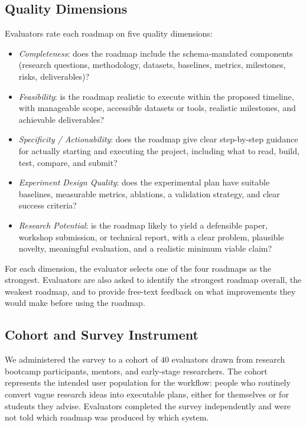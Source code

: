 \documentclass[11pt]{article}
\begin{document}
\subsection{Quality Dimensions}
\label{sec:dimensions}

Evaluators rate each roadmap on five quality dimensions:

\begin{itemize}
    \item \emph{Completeness}: does the roadmap include the schema-mandated components (research questions, methodology, datasets, baselines, metrics, milestones, risks, deliverables)?
    \item \emph{Feasibility}: is the roadmap realistic to execute within the proposed timeline, with manageable scope, accessible datasets or tools, realistic milestones, and achievable deliverables?
    \item \emph{Specificity / Actionability}: does the roadmap give clear step-by-step guidance for actually starting and executing the project, including what to read, build, test, compare, and submit?
    \item \emph{Experiment Design Quality}: does the experimental plan have suitable baselines, measurable metrics, ablations, a validation strategy, and clear success criteria?
    \item \emph{Research Potential}: is the roadmap likely to yield a defensible paper, workshop submission, or technical report, with a clear problem, plausible novelty, meaningful evaluation, and a realistic minimum viable claim?
\end{itemize}

For each dimension, the evaluator selects one of the four roadmaps as the strongest. Evaluators are also asked to identify the strongest roadmap overall, the weakest roadmap, and to provide free-text feedback on what improvements they would make before using the roadmap.

\subsection{Cohort and Survey Instrument}
\label{sec:cohort}

We administered the survey to a cohort of $40$ evaluators drawn from research bootcamp participants, mentors, and early-stage researchers. The cohort represents the intended user population for the workflow: people who routinely convert vague research ideas into executable plans, either for themselves or for students they advise. Evaluators completed the survey independently and were not told which roadmap was produced by which system.
\end{document}
